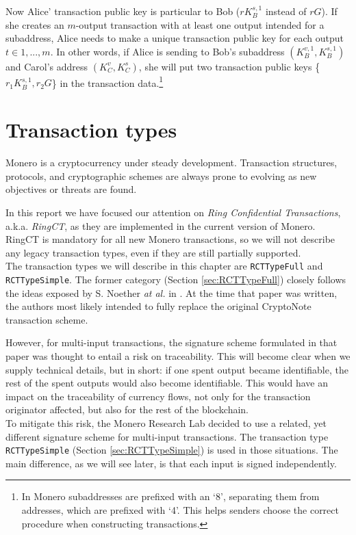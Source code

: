Now Alice' transaction public key is particular to Bob ($r K_B^{s,1}$ instead of $r G$). If she creates an $m$-output transaction with at least one output intended for a subaddress, Alice needs to make a unique transaction public key for each output $t \in 1,...,m$. In other words, if Alice is sending to Bob's subaddress $(K_B^{v,1}, K_B^{s,1})$ and Carol's address $(K_C^v, K_C^s)$, she will put two transaction public keys \{$r_1 K_B^{s,1},r_2 G$\} in the transaction data.\footnote{In Monero subaddresses are prefixed with an ‘8’, separating them from addresses, which are prefixed with ‘4’. This helps senders choose the correct procedure when constructing transactions.}


\section{Transaction types}
\label{sec:transaction_types}

Monero is a cryptocurrency under steady development. Transaction structures, protocols, and cryptographic schemes are always prone to evolving as new objectives or threats are found.

In this report we have focused our attention on {\em Ring Confidential Transactions}, a.k.a. {\em RingCT}, as they are implemented in the current version of Monero. RingCT is mandatory for all new Monero transactions, so we will not describe any legacy transaction types, even if they are still partially supported.
\\

The transaction types we will describe in this chapter are {\tt RCTTypeFull} and {\tt RCTTypeSimple}. The former category (Section \ref{sec:RCTTypeFull}) closely follows the ideas exposed by S. Noether {\em at al.} in \cite{ledger34}. At the time that paper was written, the authors most likely intended to fully replace the original CryptoNote transaction scheme.

However, for multi-input transactions, the signature scheme formulated in that paper was thought to entail a risk on traceability. This will become clear when we supply technical details, but in short: if one spent output became identifiable, the rest of the spent outputs would also become identifiable. This would have an impact on the traceability of currency flows, not only for the transaction originator affected, but also for the rest of the blockchain.
\\

To mitigate this risk, the Monero Research Lab decided to use a related, yet different signature scheme for multi-input transactions. The transaction type {\tt RCTTypeSimple} (Section \ref{sec:RCTTypeSimple}) is used in those situations. The main difference, as we will see later, is that each input is signed independently.

